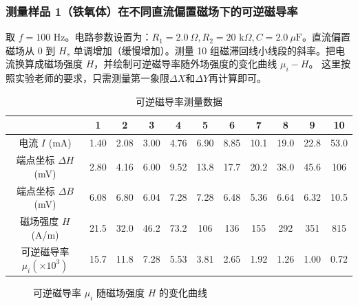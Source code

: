 \documentclass[11pt]{article}
\begin{document}
\subsubsection{测量样品 1（铁氧体）在不同直流偏置磁场下的可逆磁导率}

取 $f=100\text{ Hz}$。电路参数设置为：$R_1=2.0\ \Omega, R_2=20\text{ k}\Omega, C=2.0\ \mu\text{F}$。直流偏置磁场从 0 到 $H_s$ 单调增加（缓慢增加）。测量 10 组磁滞回线小线段的斜率。把电流换算成磁场强度 $H$，并绘制可逆磁导率随外场强度的变化曲线 $\mu_i-H$。
这里按照实验老师的要求，只需测量第一象限$\Delta X $和$\Delta Y $再计算即可。
\begin{table}[h!]
    \centering
    \caption{可逆磁导率测量数据}
    \renewcommand{\arraystretch}{1.4}
    \setlength{\tabcolsep}{4pt}
    \begin{tabular}{ccccccccccc}
        \toprule
        & 1 & 2 & 3 & 4 & 5 & 6 & 7 & 8 & 9 & 10 \\ 
        \midrule
        电流 $I$ (mA) & 1.40 & 2.08 & 3.00 & 4.76 & 6.90 & 8.85 & 10.1 & 19.0 & 22.8 & 53.0 \\
        端点坐标 $\Delta H$ (mV) & 2.80 & 4.16 & 6.00 & 9.52 & 13.8 & 17.7 & 20.2 & 38.0 & 45.6 & 106 \\
        端点坐标 $\Delta B$ (mV) & 6.08 & 6.80 & 6.04 & 7.28 & 7.28 & 6.48 & 5.36 & 6.64 & 6.32 & 10.5 \\
        磁场强度 $H$ (A/m) & 21.5 & 32.0 & 46.2 & 73.2 & 106 & 136 & 155 & 292 & 351 & 815 \\
        可逆磁导率 $\mu_i (\times 10^3)$ & 15.7 & 11.8 & 7.28 & 5.53 & 3.81 & 2.65 & 1.92 & 1.26 & 1.00 & 0.72 \\
        \bottomrule
    \end{tabular}
\end{table}

\begin{figure}[h!]
    \centering
    \caption{可逆磁导率 $\mu_i$ 随磁场强度 $H$ 的变化曲线}
    \label{fig:mu_i_curve}
\end{figure}
\end{document}
